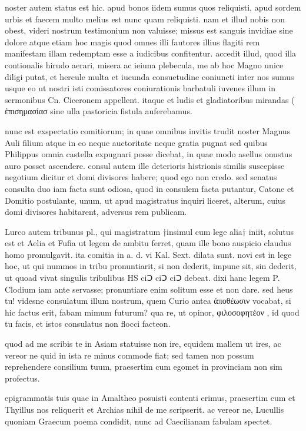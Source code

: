  noster autem status est hic. apud bonos iidem sumus quos reliquisti, apud sordem urbis et faecem multo melius est nunc quam reliquisti. nam et illud nobis non obest, videri nostrum testimonium non valuisse; missus est sanguis invidiae sine dolore atque etiam hoc magis quod omnes illi fautores illius flagiti rem manifestam illam redemptam esse a iudicibus confitentur. accedit illud, quod illa contionalis hirudo aerari, misera ac ieiuna plebecula, me ab hoc Magno unice diligi putat, et hercule multa et iucunda consuetudine coniuncti inter nos sumus usque eo ut nostri isti comissatores coniurationis barbatuli iuvenes illum in sermonibus Cn. Ciceronem appellent. itaque et ludis et gladiatoribus mirandas ( ἐπισημασίασ sine ulla pastoricia fistula auferebamus.

 nunc est exspectatio comitiorum; in quae omnibus invitis trudit noster Magnus Auli filium atque in eo neque auctoritate neque gratia pugnat sed quibus Philippus omnia castella expugnari posse dicebat, in quae modo asellus onustus auro posset ascendere. consul autem ille deterioris histrionis similis suscepisse negotium dicitur et domi divisores habere; quod ego non credo. sed senatus consulta duo iam facta sunt odiosa, quod in consulem facta putantur, Catone et Domitio postulante, unum, ut apud magistratus inquiri liceret, alterum, cuius domi divisores habitarent, adversus rem publicam.

 Lurco autem tribunus pl., qui magistratum †insimul cum lege alia† iniit, solutus est et Aelia et Fufia ut legem de ambitu ferret, quam ille bono auspicio claudus homo promulgavit. ita comitia in a. d. vi Kal. Sext. dilata sunt. novi est in lege hoc, ut qui nummos in tribu pronuntiarit, si non dederit, impune sit, sin dederit, ut quoad vivat singulis tribulibus HS ciↃ ciↃ ciↃ debeat. dixi hanc legem P. Clodium iam ante servasse; pronuntiare enim solitum esse et non dare. sed heus tu! videsne consulatum illum nostrum, quem Curio antea ἀποθέωσιν vocabat, si hic factus erit, fabam mimum futurum? qua re, ut opinor, φιλοσοφητέον , id quod tu facis, et istos consulatus non flocci facteon.

 quod ad me scribis te in Asiam statuisse non ire, equidem mallem ut ires, ac vereor ne quid in ista re minus commode fiat; sed tamen non possum reprehendere consilium tuum, praesertim cum egomet in provinciam non sim profectus.

 epigrammatis tuis quae in Amaltheo posuisti contenti erimus, praesertim cum et Thyillus nos reliquerit et Archias nihil de me scripserit. ac vereor ne, Lucullis quoniam Graecum poema condidit, nunc ad Caecilianam fabulam spectet.

